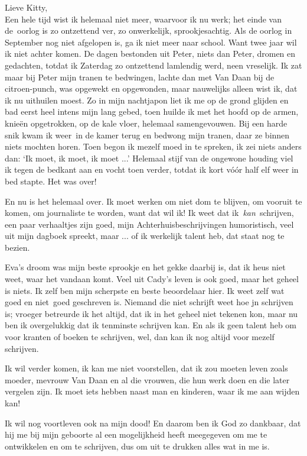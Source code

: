 \documentclass{book}
\begin{document}
Lieve Kitty,\\Een hele tijd wist ik helemaal niet meer, waarvoor ik nu
werk; het einde van de~oorlog is zo ontzettend ver, zo onwerkelijk,
sprookjesachtig. Als de oorlog in September nog niet afgelopen is, ga ik
niet meer naar school. Want twee jaar wil ik niet achter komen. De dagen
bestonden uit Peter, niets dan Peter, dromen en gedachten, totdat ik
Zaterdag zo ontzettend lamlendig werd, neen vreselijk. Ik zat maar bij
Peter mijn tranen te bedwingen, lachte dan met Van Daan bij de
citroen-punch, was opgewekt en opgewonden, maar nauwelijks alleen wist
ik, dat ik nu uithuilen moest. Zo in mijn nachtjapon liet ik me op de
grond glijden en bad eerst heel intens mijn lang gebed, toen huilde ik
met het hoofd op de armen, knieën opgetrokken, op de kale vloer,
helemaal samengevouwen. Bij een harde snik kwam ik weer~in de kamer
terug en bedwong mijn tranen, daar ze binnen niets mochten horen. Toen
begon ik mezelf moed in te spreken, ik zei niets anders dan: `Ik moet,
ik moet, ik moet ...' Helemaal stijf van de ongewone houding viel ik
tegen de bedkant aan en vocht toen verder, totdat ik kort vóór half elf
weer in bed stapte. Het was over!

En nu is het helemaal over. Ik moet werken om niet dom te blijven, om
vooruit te komen, om journaliste te worden, want dat wil ik! Ik weet dat
ik~\emph{kan}~schrijven, een paar verhaaltjes zijn goed, mijn
Achterhuisbeschrijvingen humoristisch, veel uit mijn dagboek spreekt,
maar ... of ik werkelijk talent heb, dat staat nog te bezien.

Eva's droom was mijn beste sprookje en het gekke daarbij is, dat ik heus
niet weet, waar het vandaan komt. Veel uit Cady's leven is ook goed,
maar het geheel is niets. Ik zelf ben mijn scherpste en beste
beoordelaar hier. Ik weet zelf wat goed en niet~goed geschreven is.
Niemand die niet schrijft weet hoe jn schrijven is; vroeger betreurde ik
het altijd, dat ik in het geheel niet tekenen kon, maar nu ben ik
overgelukkig dat ik tenminste schrijven kan. En als ik geen talent heb
om voor kranten of boeken te schrijven, wel, dan kan ik nog altijd voor
mezelf schrijven.

Ik wil verder komen, ik kan me niet voorstellen, dat ik zou moeten leven
zoals moeder, mevrouw Van Daan en al die vrouwen, die hun werk doen en
die later vergelen zijn. Ik moet iets hebben naast man en kinderen, waar
ik me aan wijden kan!

Ik wil nog voortleven ook na mijn dood! En daarom ben ik God zo
dankbaar, dat hij me bij mijn geboorte al een mogelijkheid heeft
meegegeven om me te ontwikkelen en om te schrijven, dus om uit te
drukken alles wat in me is.
\end{document}
